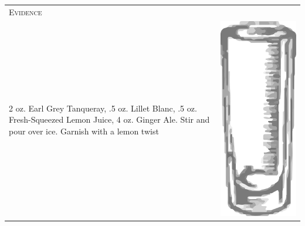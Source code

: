 \documentclass{article}
\begin{document}
\begin{multicols}{2}
\begin{tabular}{p{2in} p{0.5in}}
\multicolumn{2}{p{3in}}{\centering\Huge\textsc{Evidence}}\\ 
  \vspace{-0.1in}2 oz. Earl Grey Tanqueray, .5 oz. Lillet Blanc, .5 oz. Fresh-Squeezed Lemon Juice, 4 oz. Ginger Ale. Stir and pour over ice. Garnish with a lemon twist &
  \vspace{-0.1in} \includegraphics{collins.png}
\end{tabular}


\end{multicols}
\end{document}
